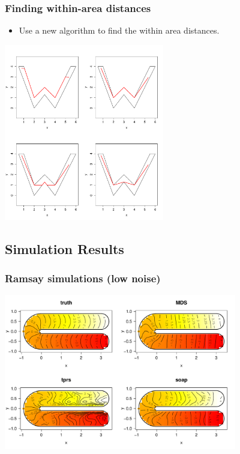 \documentclass[ignorenonframetext]{beamer} %
\newcommand{\bi}{\begin{itemize}}
\newcommand{\ei}{\end{itemize}}
\begin{document}
\begin{frame}
	\frametitle{Finding within-area distances}
       \bi
         \item Use a new algorithm to find the within area distances.
        \ei
            \centering
              \includegraphics[width=2.75in]{figs/doubleyah-example.pdf}\\
\end{frame}



\subsection{Simulation Results}

\begin{frame}
	\frametitle{Ramsay simulations (low noise)}
            \centering
              \includegraphics[width=4in]{figs/ramsay-low.pdf}\\
\end{frame}
\end{document}
